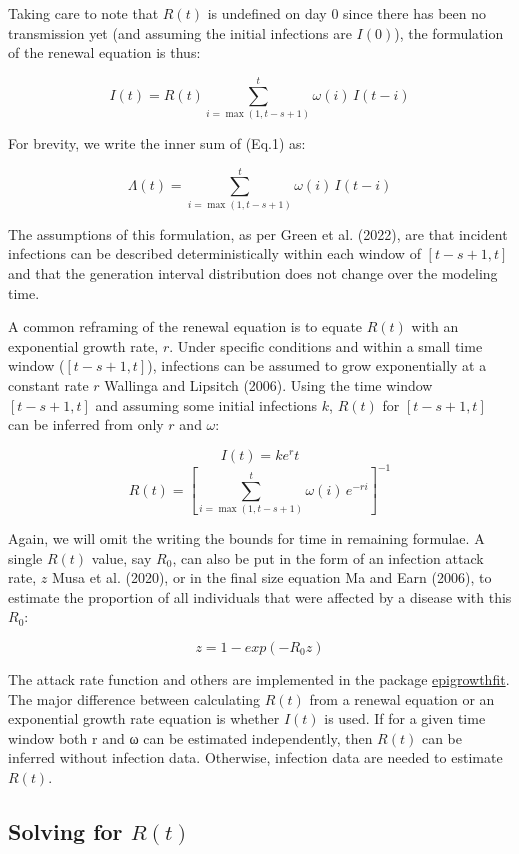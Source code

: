 \documentclass[
  letterpaper,
  DIV=11,
  numbers=noendperiod]{scrreprt}
\begin{document}
Taking care to note that \(R(t)\) is undefined on day 0 since there has
been no transmission yet (and assuming the initial infections are
\(I(0)\)), the formulation of the renewal equation is thus:

\[
I(t) = R(t) \sum_{i = \max(1, t - s + 1)}^{t} \omega(i) \, I(t - i)
\]

For brevity, we write the inner sum of (Eq.1) as:

\[
Λ(t) =  \sum_{i = \max(1, t - s + 1)}^{t} \omega(i) \, I(t - i)
\]

The assumptions of this formulation, as per Green et al. (2022), are
that incident infections can be described deterministically within each
window of \([t-s+1,t]\) and that the generation interval distribution
does not change over the modeling time.

A common reframing of the renewal equation is to equate \(R(t)\) with an
exponential growth rate, \(r\). Under specific conditions and within a
small time window (\([t-s+1,t]\)), infections can be assumed to grow
exponentially at a constant rate \(r\) Wallinga and Lipsitch (2006).
Using the time window \([t- s+1,t]\) and assuming some initial
infections \(k\), \(R(t)\) for \([t- s+1,t]\) can be inferred from only
\(r\) and \(ω\):

\[
I(t)=ke^rt
\] \[
R(t)= [\sum_{i = \max(1, t - s + 1)}^{t} \omega(i) \, e^{-ri}]^{-1}        
\]

Again, we will omit the writing the bounds for time in remaining
formulae. A single \(R(t)\) value, say \(R_0\), can also be put in the
form of an infection attack rate, \(z\) Musa et al. (2020), or in the
final size equation Ma and Earn (2006), to estimate the proportion of
all individuals that were affected by a disease with this \(R_0\):

\[
z=1-exp⁡(-R_0  z)                   
\]

The attack rate function and others are implemented in the package
\href{package_epigrowthfit.qmd}{epigrowthfit}. The major difference
between calculating \(R(t)\) from a renewal equation or an exponential
growth rate equation is whether \(I(t)\) is used. If for a given time
window both r and ω can be estimated independently, then \(R(t)\) can be
inferred without infection data. Otherwise, infection data are needed to
estimate \(R(t)\).

\subsection*{\texorpdfstring{Solving for
\(R(t)\)}{Solving for R(t)}}\label{solving-for-rt}
\end{document}
